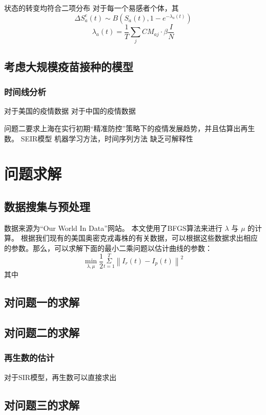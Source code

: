 \documentclass[bwprint]{gmcmthesis}
\numberwithin{figure}{section}
\begin{document}
\par 状态的转变均符合二项分布
对于每一个易感者个体，其
\begin{equation}
\Delta S^e_a(t)\sim B(S_a(t),1-e^{-\lambda_a(t)})
\end{equation}
\begin{equation}
\lambda_a(t)=\frac{1}{T}\sum_jCM_{aj}\cdot\beta\frac{I}{N}
\end{equation}
\subsection{考虑大规模疫苗接种的模型}
\subsubsection{时间线分析}

对于美国的疫情数据
对于中国的疫情数据



问题二要求上海在实行初期“精准防控”策略下的疫情发展趋势，并且估算出再生数。
SEIR模型
机器学习方法，时间序列方法
缺乏可解释性

\section{问题求解}
\subsection{数据搜集与预处理}
数据来源为“Our World In Data”网站。
本文使用了BFGS算法来进行 $\lambda$ 与 $\mu$ 的计算。
根据我们现有的美国奥密克戎毒株的有关数据，可以根据这些数据求出相应的参数。那么，可以求解下面的最小二乘问题以估计曲线的参数：
\begin{equation} \label{}
    \underset{\lambda ,\mu}{\min}\frac{1}{2}\underset{t=1}{\overset{T}{\varSigma}}\left\| I_r\left( t \right) -I_p\left( t \right) \right\| ^2
\end{equation}
其中
\subsection{对问题一的求解}
\subsection{对问题二的求解}
\subsubsection{再生数的估计}
对于SIR模型，再生数可以直接求出
\subsection{对问题三的求解}
\end{document}

